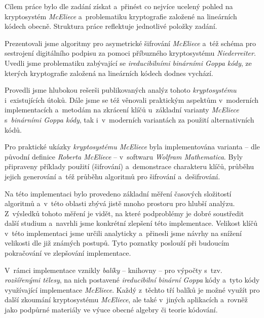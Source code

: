 \documentclass[thesis=M,czech,hidelinks]{FITthesis}[2012/06/26]
\newcommand{\0}{{\textcolor[gray]{0.75}{0}}}
\begin{document}
\begin{conclusion}

Cílem práce bylo dle zadání získat a~přinést co nejvíce ucelený pohled na
kryptosystém \emph{McEliece} a~problematiku kryptografie založené na lineárních
kódech obecně. Struktura práce reflektuje jednotlivé položky zadání.

\vspace{0.5cm}

Prezentovali jsme algoritmy pro asymetrické šifrování \emph{McEliece} a~též
sché\-ma pro sestrojení digitálního podpisu za pomoci příbuzného kryptosystému
\emph{Niederreiter}. Uvedli jsme problematiku zabývající se
\emph{ireducibilními binárními Goppa kódy}, ze kterých kryptografie
založená na lineárních kódech dodnes vychází.

Provedli jsme hlubokou rešerši publikovaných analýz tohoto \emph{kryptosystému}
i~existujících útoků. Dále jsme se též věnovali praktickým aspektům v~moderních
implementacích a~metodám na zkrácení klíčů u~základní varianty \emph{McEliece}
s~\emph{binárními Goppa kódy}, tak i~v~moderních variantách za použití
alternativních kódů.

Pro praktické ukázky \emph{kryptosystému McEliece} byla implementována
varianta -- dle původní definice \emph{Roberta McEliece} -- v~softwaru
\emph{Wolfram Mathematica}. Byly připraveny příklady použití (šifrování)
a~demonstrace charakteru klíčů, průběhu jejich generování a~též průběhu
algoritmů pro šifrování a~dešifrování.

Na této implementaci bylo provedeno základní měření časových složitostí
algoritmů a~v~této oblasti zbývá jistě mnoho prostoru pro hlubší analýzu.
Z~výsledků tohoto měření je vidět, na které podproblémy je dobré soustředit
další studium a~navrhli jsme konkrétní zlepšení této implementace. Velikost
klíčů v~této implementaci jsme určili analyticky a~přinesli jsme návrhy na
snížení velikosti dle již známých postupů. Tyto poznatky poslouží při budoucím
pokračování ve zlepšování implementace.

V~rámci implementace vznikly \emph{balíky} -- knihovny -- pro výpočty s~tzv.
\emph{rozšířenými tělesy}, na nich postavené \emph{ireducibilní binární Goppa}
kódy a~tyto kódy využívající implementace \emph{McEliece}. Každý z~těchto tří
balíků je možné využít pro další zkoumání kryptosystému \emph{McEliece}, ale
také v~jiných aplikacích a~rovněž jako podpůrné materiály ve výuce obecné
algebry či teorie kódování.


\end{conclusion}
\end{document}
